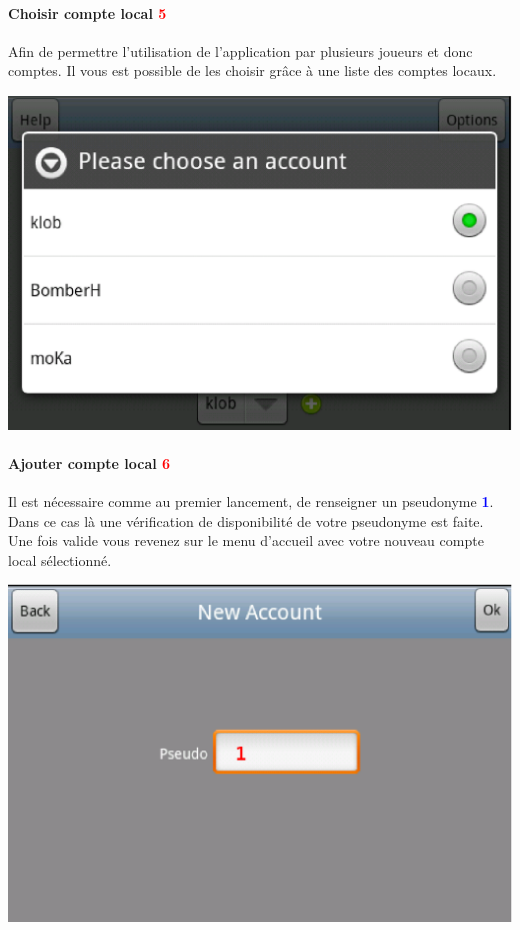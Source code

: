 			
\paragraph{Choisir compte local \textcolor{red}{5}\\}
	Afin de permettre l'utilisation de l'application par plusieurs joueurs et donc
	comptes. Il vous est possible de les choisir grâce à une liste des comptes
	locaux. 
	\begin{center}
		\includegraphics[scale=0.6]{Manuel/Img/8.eps}
	\end{center}
	
\newpage{}	

\paragraph{Ajouter compte local \textcolor{red}{6}\\}
	Il est nécessaire comme au premier lancement, de renseigner un pseudonyme 
	\textcolor{blue}{\textbf{1}}. Dans ce cas là une vérification de disponibilité
	de votre pseudonyme est faite. Une fois valide vous
	revenez sur le menu d'accueil avec votre nouveau compte local sélectionné.
	\begin{center}
		\includegraphics[scale=0.6]{Manuel/Img/9.eps}
	\end{center}
	
	
